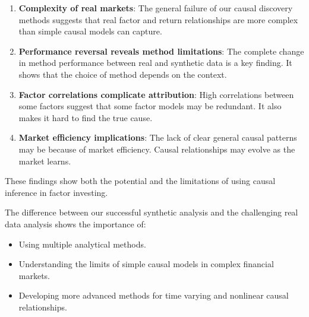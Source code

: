 \begin{enumerate}
    \item \textbf{Complexity of real markets}: The general failure of our causal discovery methods suggests that real factor and return relationships are more complex than simple causal models can capture.
    
    \item \textbf{Performance reversal reveals method limitations}: The complete change in method performance between real and synthetic data is a key finding. It shows that the choice of method depends on the context.
    
    \item \textbf{Factor correlations complicate attribution}: High correlations between some factors suggest that some factor models may be redundant. It also makes it hard to find the true cause.
    
    \item \textbf{Market efficiency implications}: The lack of clear general causal patterns may be because of market efficiency. Causal relationships may evolve as the market learns.
\end{enumerate}

These findings show both the potential and the limitations of using causal inference in factor investing.

The difference between our successful synthetic analysis and the challenging real data analysis shows the importance of:
\begin{itemize}
    \item Using multiple analytical methods.
    \item Understanding the limits of simple causal models in complex financial markets.
    \item Developing more advanced methods for time varying and nonlinear causal relationships.
\end{itemize}